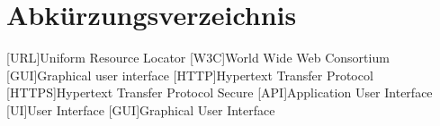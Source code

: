 \newpage
\chapter*{Abkürzungsverzeichnis}
\begin{acronym}
    [URL]{Uniform Resource Locator}
    [W3C]{World Wide Web Consortium}
    [GUI]{Graphical user interface}
    [HTTP]{Hypertext Transfer Protocol}
    [HTTPS]{Hypertext Transfer Protocol Secure}
    [API]{Application User Interface}
    [UI]{User Interface}
    [GUI]{Graphical User Interface}
\end{acronym}